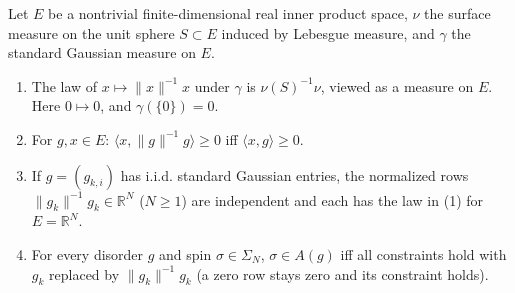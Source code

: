 \begin{theorem}\label{thm:sg-tal:perceptron-sphere}
  \leanok
{}
Let $E$ be a nontrivial finite-dimensional real inner product space, $\nu$ the surface measure on the unit
sphere $S\subset E$ induced by Lebesgue measure, and $\gamma$ the standard Gaussian measure on $E$.
\begin{enumerate}
\item The law of $x\mapsto\|x\|^{-1}x$ under $\gamma$ is $\nu(S)^{-1}\nu$, viewed as a measure on $E$. Here
$0\mapsto0$, and $\gamma(\{0\})=0$.
\item For $g,x\in E$: $\langle x,\|g\|^{-1}g\rangle\ge0$ iff $\langle x,g\rangle\ge0$.
\item If $g=(g_{k,i})$ has i.i.d. standard Gaussian entries, the normalized rows
$\|g_k\|^{-1}g_k\in\mathbb R^N$ ($N\ge1$) are independent and each has the law in (1) for $E=\mathbb R^N$.
\item For every disorder $g$ and spin $\sigma\in\Sigma_N$, $\sigma\in A(g)$ iff all constraints hold with $g_k$
replaced by $\|g_k\|^{-1}g_k$ (a zero row stays zero and its constraint holds).
\end{enumerate}
\end{theorem}
